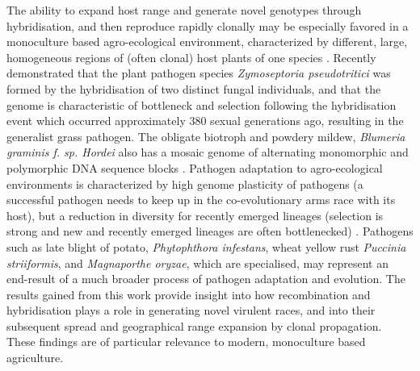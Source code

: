 The ability to expand host range and generate novel genotypes through hybridisation, and then reproduce rapidly clonally may be especially favored in a monoculture based agro-ecological environment, characterized by different, large, homogeneous regions of (often clonal) host plants of one species \parencite{Stukenbrock2012AAgro-Ecosystems}⁠. Recently \cite{Stukenbrock2012}⁠ demonstrated that the plant pathogen species \textit{Zymoseptoria pseudotritici} was formed by the hybridisation of two distinct fungal individuals, and that the genome is characteristic of bottleneck and selection following the hybridisation event which occurred approximately 380 sexual generations ago, resulting in the generalist grass pathogen. The obligate biotroph and powdery mildew, \textit{Blumeria graminis f. sp. Hordei} also has a mosaic genome of alternating monomorphic and polymorphic DNA sequence blocks \parencite{Hacquard2013MosaicHosts.}. Pathogen adaptation to agro-ecological environments is characterized by high genome plasticity of pathogens (a successful pathogen needs to keep up in the co-evolutionary arms race with its host), but a reduction in diversity for recently emerged lineages (selection is strong and new and recently emerged lineages are often bottlenecked) \parencite{Stukenbrock2012AAgro-Ecosystems}⁠. Pathogens such as late blight of potato, \textit{Phytophthora infestans}, wheat yellow rust \textit{Puccinia striiformis}, and \textit{Magnaporthe oryzae}, which are specialised, may represent an end-result of a much broader process of pathogen adaptation and evolution. The results gained from this work provide insight into how recombination and hybridisation plays a role in generating novel virulent races, and into their subsequent spread and geographical range expansion by clonal propagation. These findings are of particular relevance to modern, monoculture based agriculture.  
